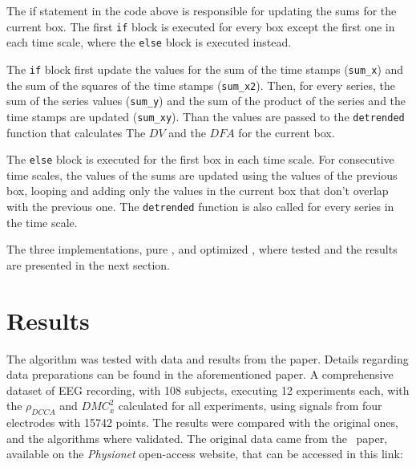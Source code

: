 \documentclass[nojss]{jss}
\begin{document}
The if statement in the code above is responsible for updating the sums for the current box. The first \verb"if" block is executed for
every box except the first one in each time scale, where the \verb"else" block is executed instead. 

The \verb"if" block first update the values for the sum of the time stamps (\verb"sum_x") and the sum of the squares of the time stamps (\verb"sum_x2"). Then, for every series, the sum of the series values (\verb"sum_y") and the sum of the product of the series and the time stamps are updated (\verb"sum_xy"). Than the values are passed to the \verb"detrended" function that calculates The $DV$ and the $DFA$ for the current box.

The \verb"else" block is executed for the first box in each time scale. For consecutive time scales, the values of the sums are updated using the values of the previous box, looping and adding only the values in the current box that don't overlap with the previous one. The \verb"detrended" function is also called for every series in the time scale.

The three implementations, pure ,  and optimized , where tested and the results are presented in the next section.
 


\section{Results} \label{sec:results}

The algorithm was tested with data and results from the \cite{RIBEIRO2025107419} paper. Details regarding data preparations can be found in the aforementioned paper. A comprehensive dataset of EEG recording, with 108 subjects, executing 12 experiments each, with the $\rho_{DCCA}$ and $DMC_{x}^{2}$ calculated for all experiments, using signals from four electrodes with 15742 points. The results were compared with the original ones, and the algorithms where validated. The original data came from the~\cite{schalk2004bci2000} paper, available on the \textit{Physionet} open-access website, that can be accessed in this link:
\end{document}
